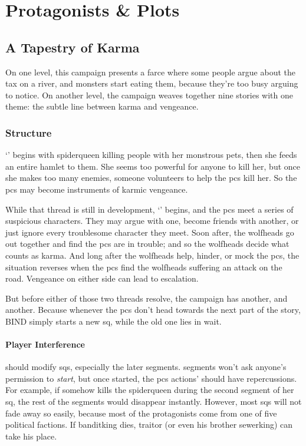 \chapter{Protagonists \& Plots}
\label{sideQuestIntro}

\section{A Tapestry of Karma}
\label{sqSummaries}

\noindent
On one level, this \gls{campaign} presents a farce where some people argue about the tax on a river, and monsters start eating them, because they're too busy arguing to notice.
On another level, the \gls{campaign} weaves together nine stories with one theme: the subtle line between karma and vengeance.

\begin{multicols}{2}

\subsection{Structure}

`' begins with \gls{spiderqueen} killing people with her monstrous pets, then she feeds an entire hamlet to them.
She seems too powerful for anyone to kill her, but once she makes too many enemies, someone volunteers to help the \glspl{pc} kill her.
So the \glspl{pc} may become instruments of karmic vengeance.

While that thread is still in development, `' begins, and the \glspl{pc} meet a series of suspicious characters.
They may argue with one, become friends with another, or just ignore every troublesome character they meet.
Soon after, the \glspl{wolfhead} go out together and find the \glspl{pc} are in trouble; and so the \glspl{wolfhead} decide what counts as karma.
And long after the \glspl{wolfhead} help, hinder, or mock the \glspl{pc}, the situation reverses when the \glspl{pc} find the \glspl{wolfhead} suffering an attack on the road.
Vengeance on either side can lead to escalation.

But before either of those two threads resolve, the \gls{campaign} has another, and another.
Because whenever the \glspl{pc} don't head towards the next part of the story, BIND simply starts a new \gls{sq}, while the old one lies in wait.

\subsubsection{Player Interference}
should modify \glspl{sq}, especially the later \glspl{segment}.
\Glspl{segment} won't ask anyone's permission to \textit{start}, but once started, the \glspl{pc} actions' should have repercussions.
For example, if  somehow kills the \gls{spiderqueen} during the second \gls{segment} of her \gls{sq}, the rest of the \glspl{segment} would disappear instantly.
However, most \glspl{sq} will not fade away so easily, because most of the protagonists come from one of five political factions.
If \gls{banditking} dies, \gls{traitor} (or even his brother \gls{sewerking}) can take his place.


\end{multicols}
